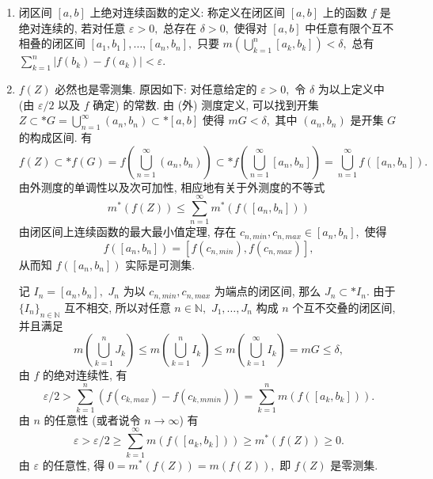 \begin{solution}
\begin{enumerate}
\item 闭区间 $[a, b]$ 上绝对连续函数的定义: 称定义在闭区间 $[a, b]$ 上的函数 $f$ 是绝对连续的, 若对任意 $\varepsilon > 0,$ 总存在 $\delta > 0,$ 使得对 $[a, b]$ 中任意有限个互不相叠的闭区间 $[a_1, b_1], \dots, [a_n, b_n],$ 只要 $\displaystyle m \left( \bigcup_{k=1}^n [a_k, b_k] \right) < \delta,$ 总有 $\displaystyle \sum_{k=1}^n \left\lvert f(b_k) - f(a_k) \right\rvert < \varepsilon.$ 

\item $f(Z)$ 必然也是零测集. 
原因如下: 
对任意给定的 $\varepsilon > 0,$ 令 $\delta$ 为以上定义中 (由 $\varepsilon/2$ 以及 $f$ 确定) 的常数. 由 (外) 测度定义, 可以找到开集 $Z \subset* \displaystyle G = \bigcup_{n=1}^{\infty} (a_n, b_n) \subset* [a, b]$ 使得 $m G < \delta,$ 其中 $(a_n, b_n)$ 是开集 $G$ 的构成区间. 有
\begin{equation*}
f(Z) \subset* f(G) = f \left( \bigcup_{n=1}^{\infty} (a_n, b_n) \right) \subset* f \left( \bigcup_{n=1}^{\infty} [a_n, b_n] \right) = \bigcup_{n=1}^{\infty} f ( [a_n, b_n] ).
\end{equation*}
由外测度的单调性以及次可加性, 相应地有关于外测度的不等式
\begin{equation*}
m^* (f(Z)) \leqslant \sum_{n=1}^{\infty} m^* (f ( [a_n, b_n] ))
\end{equation*}
由闭区间上连续函数的最大最小值定理, 存在 $c_{n, min}, c_{n, max} \in [a_n, b_n],$ 使得
$$f ( [a_n, b_n] ) = [f(c_{n, min}), f(c_{n, max})],$$
从而知 $f ( [a_n, b_n] )$ 实际是可测集.

记 $I_n = [a_n, b_n],$ $J_n$ 为以 $c_{n, min}, c_{n, max}$ 为端点的闭区间, 那么 $J_n \subset* I_n.$ 由于 $\{I_n\}_{n \in \mathbb{N}}$ 互不相交, 所以对任意 $n \in \mathbb{N},$ $J_1, \dots, J_n$ 构成 $n$ 个互不交叠的闭区间, 并且满足
$$m \left( \bigcup_{k=1}^n J_k \right) \leqslant m \left( \bigcup_{k=1}^n I_k \right) \leqslant m \left( \bigcup_{k=1}^{\infty} I_k \right) = m G \leqslant \delta,$$
由 $f$ 的绝对连续性, 有
$$
\varepsilon/2 > \sum_{k=1}^n (f(c_{k, max}) - f(c_{k, mmin})) = \sum_{k=1}^n m (f ( [a_k, b_k] )).
$$
由 $n$ 的任意性 (或者说令 $n \to \infty$) 有
$$\varepsilon > \varepsilon / 2 \geqslant \sum_{k=1}^{\infty} m (f ( [a_k, b_k] )) \geqslant m^* (f(Z)) \geqslant 0.$$
由 $\varepsilon$ 的任意性, 得 $0 = m^* (f(Z)) = m (f(Z)),$ 即 $f(Z)$ 是零测集.
\end{enumerate}
\end{solution}

